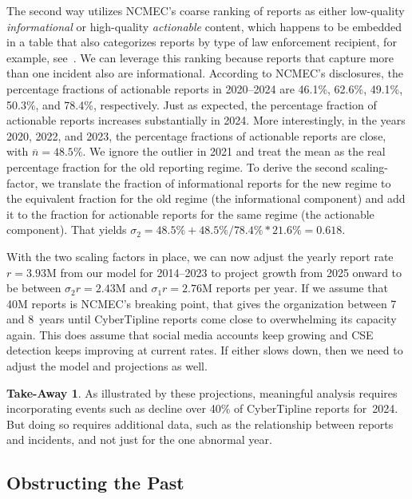 \documentclass[anonymous,nonacm,screen,12pt]{acmart}
\newcommand\V[1]{{#1}}
\newcommand\V[1]{\textsc{\MakeLowercase{#1}}}
\theoremstyle{definition}
\newtheorem{takeout}{Take-Away}
\begin{document}
The second way utilizes \V{NCMEC}'s coarse ranking of reports as either
low-quality \emph{informational} or high-quality \emph{actionable} content,
which happens to be embedded in a table that also categorizes reports by type of
law enforcement recipient, for example, see~\citet{NcmecOjjdp2024}. We can
leverage this ranking because reports that capture more than one incident also
are informational. According to \V{NCMEC}'s disclosures, the percentage
fractions of actionable reports in 2020--2024 are 46.1\%, 62.6\%, 49.1\%,
50.3\%, and 78.4\%, respectively. Just as expected, the percentage fraction of
actionable reports increases substantially in 2024. More interestingly, in the
years 2020, 2022, and 2023, the percentage fractions of actionable reports are
close, with $\overline{n} = 48.5\%$. We ignore the outlier in 2021 and treat the
mean as the real percentage fraction for the old reporting regime. To derive the
second scaling-factor, we translate the fraction of informational reports for
the new regime to the equivalent fraction for the old regime (the informational
component) and add it to the fraction for actionable reports for the same regime
(the actionable component). That yields $\sigma_2 = 48.5\% + 48.5\% / 78.4\% *
21.6\% = 0.618$.

With the two scaling factors in place, we can now adjust the yearly report rate
$r = 3.93$\V{M} from our model for 2014--2023 to project growth from 2025
onward to be between $\sigma_2 r = 2.43$\V{M} and $\sigma_1 r = 2.76$\V{M}
reports per year. If we assume that 40\V{M} reports is \V{NCMEC}'s breaking
point, that gives the organization between 7 and 8~years until CyberTipline
reports come close to overwhelming its capacity again. This does assume that
social media accounts keep growing and \V{CSE} detection keeps improving at
current rates. If either slows down, then we need to adjust the model and
projections as well.

\begin{takeout}
As illustrated by these projections, meaningful analysis requires incorporating
events such as decline over 40\% of CyberTipline reports for~2024. But doing so
requires additional data, such as the relationship between reports and
incidents, and not just for the one abnormal year.
\end{takeout}


\subsection{Obstructing the Past}
\end{document}
